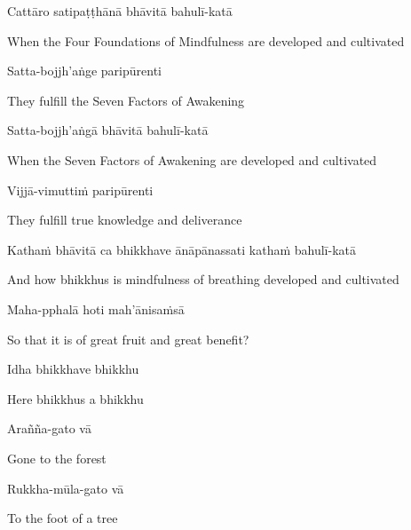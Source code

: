 Cattāro satipaṭṭhānā bhāvitā bahulī-katā

\begin{english-hang}
  When the Four Foundations of Mindfulness are developed and cultivated
\end{english-hang}

Satta-bojjh'aṅge paripūrenti

\begin{english}
  They fulfill the Seven Factors of Awakening
\end{english}

\ifninebythirteen\clearpage\fi

Satta-bojjh'aṅgā bhāvitā bahulī-katā

\begin{english-hang}
  When the Seven Factors of Awakening are developed and cultivated
\end{english-hang}

Vijjā-vimuttiṁ paripūrenti

\begin{english}
  They fulfill true knowledge and deliverance
\end{english}

\begin{pali-hang}
Kathaṁ bhāvitā ca bhikkhave ānāpānassati kathaṁ bahulī-katā
\end{pali-hang}

\begin{english-hang}
  And how bhikkhus is mindfulness of breathing developed and cultivated
\end{english-hang}

Maha-pphalā hoti mah'ānisaṁsā

\begin{english}
  So that it is of great fruit and great benefit?
\end{english}

Idha bhikkhave bhikkhu

\begin{english}
  Here bhikkhus a bhikkhu
\end{english}

Arañña-gato vā

\begin{english}
  Gone to the forest
\end{english}

Rukkha-mūla-gato vā

\begin{english}
  To the foot of a tree
\end{english}

